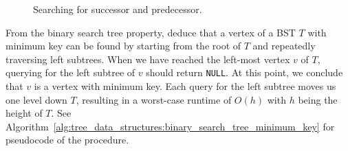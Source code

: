 \begin{figure}[!htbp]
\centering
{}
\qquad
{}

\caption{Searching for successor and predecessor.}
\label{fig:tree_data_structures:binary_search_tree_successor_predecessor}
\end{figure}

From the binary search tree property, deduce that a vertex of a BST
$T$ with minimum key can be found by starting from the root of $T$ and
repeatedly traversing left subtrees. When we have reached the
left-most vertex $v$ of $T$, querying for the left subtree of $v$
should return \texttt{NULL}. At this point, we conclude that $v$ is a
vertex with minimum key. Each query for the left subtree moves us one
level down $T$, resulting in a worst-case runtime of $O(h)$ with $h$
being the height of $T$. See
Algorithm~\ref{alg:tree_data_structures:binary_search_tree_minimum_key}
for pseudocode of the procedure.

